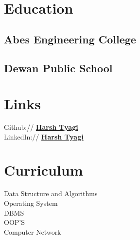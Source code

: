 \documentclass[]{deedy-resume-openfont}
\begin{document}
%
%

%
%


%
%

\begin{minipage}[t]{0.33\textwidth} 


\section{Education} 

\subsection{Abes Engineering College}
\sectionsep

\subsection{Dewan Public School}
\sectionsep



\section{Links} 

Github:// \href{https://github.com/Htyagi2003}{\bf Harsh Tyagi} \\
LinkedIn://  \href{https://www.linkedin.com/in/harsh-tyagi03/}{\bf Harsh Tyagi} \\




\section{Curriculum}
\textbullet Data Structure and Algorithms\\
\textbullet Operating System\\
\textbullet DBMS\\
\textbullet OOP’S\\
\textbullet Computer Network\\
\sectionsep


\end{minipage}
\end{document}

